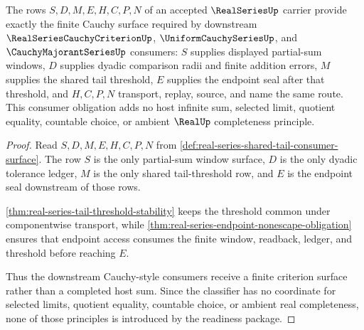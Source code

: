 \begin{theorem}\label{thm:real-series-cauchy-consumer-obligation}
The rows $S,D,M,E,H,C,P,N$ of an accepted $\RealSeriesUp$ carrier provide exactly the finite Cauchy surface required by downstream $\RealSeriesCauchyCriterionUp$, $\UniformCauchySeriesUp$, and $\CauchyMajorantSeriesUp$ consumers: $S$ supplies displayed partial-sum windows, $D$ supplies dyadic comparison radii and finite addition errors, $M$ supplies the shared tail threshold, $E$ supplies the endpoint seal after that threshold, and $H,C,P,N$ transport, replay, source, and name the same route. This consumer obligation adds no host infinite sum, selected limit, quotient equality, countable choice, or ambient $\RealUp$ completeness principle.
\end{theorem}
\begin{proof}
Read $S,D,M,E,H,C,P,N$ from \autoref{def:real-series-shared-tail-consumer-surface}. The row $S$ is the only partial-sum window surface, $D$ is the only dyadic tolerance ledger, $M$ is the only shared tail-threshold row, and $E$ is the endpoint seal downstream of those rows.

\autoref{thm:real-series-tail-threshold-stability} keeps the threshold common under componentwise transport, while \autoref{thm:real-series-endpoint-nonescape-obligation} ensures that endpoint access consumes the finite window, readback, ledger, and threshold before reaching $E$.

Thus the downstream Cauchy-style consumers receive a finite criterion surface rather than a completed host sum. Since the classifier has no coordinate for selected limits, quotient equality, countable choice, or ambient real completeness, none of those principles is introduced by the readiness package.
\end{proof}

